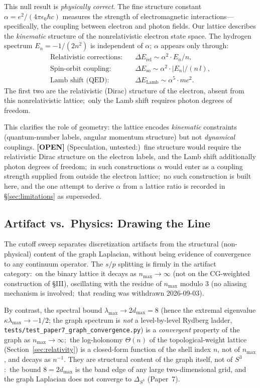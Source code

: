 \documentclass[aps,pra,twocolumn,superscriptaddress,longbibliography]{revtex4-2}
\newcommand{\gvc}[2]{#2}
\begin{document}
This null result is \textit{physically correct}. The fine structure constant $\alpha = e^2/(4\pi\epsilon_0 \hbar c)$ measures the strength of electromagnetic interactions---specifically, the coupling between electron and photon fields. Our lattice describes the \textit{kinematic} structure of the nonrelativistic electron state space. The hydrogen spectrum $E_n = -1/(2n^2)$ is independent of $\alpha$; $\alpha$ appears only through:
\begin{align}
\text{Relativistic corrections:} \quad & \Delta E_{\text{rel}} \sim \alpha^2 \cdot E_n / n, \\
\text{Spin-orbit coupling:} \quad & \Delta E_{\text{so}} \sim \alpha^2 \cdot |E_n| / (n\,l), \\
\text{Lamb shift (QED):} \quad & \Delta E_{\text{Lamb}} \sim \alpha^5 \cdot mc^2.
\end{align}
The first two are the relativistic (Dirac) structure of the electron, absent from this nonrelativistic lattice;\ only the Lamb shift requires photon degrees of freedom.

This clarifies the role of geometry: the lattice encodes \textit{kinematic} constraints (quantum-number labels, angular momentum structure) but not \textit{dynamical} couplings. \textbf{[OPEN]} (Speculation, untested:)\ fine structure would require the relativistic Dirac structure on the electron labels, and the Lamb shift additionally photon degrees of freedom;\ in such constructions $\alpha$ would enter as a coupling strength supplied from outside the electron lattice;\ no such construction is built here, and the one attempt to derive $\alpha$ from a lattice ratio is recorded in \S\ref{sec:limitations} as superseded.

\subsection{Artifact vs.\ Physics: Drawing the Line}

The cutoff sweep separates discretization artifacts from the
structural (non-physical) content of the graph Laplacian, without being
evidence of convergence to any continuum operator. The $s/p$ splitting is
firmly in the artifact category:\ on the binary lattice it decays as
$n_{\max} \to \infty$ (not on the CG-weighted construction of \S III),
oscillating with the residue of $n_{\max}$ modulo $3$ (no aliasing
mechanism is involved;\ that reading was withdrawn 2026-09-03).

By contrast, the spectral bound $\lambda_{\max} \to 2 d_{\max} = 8$
(hence the extremal eigenvalue $\kappa\lambda_{\max} \to -1/2$; the graph
spectrum is \emph{not} a level-by-level Rydberg ladder,
\texttt{tests/test\_paper7\_graph\_convergence.py}) is a \emph{convergent}
property of the graph as $n_{\max} \to \infty$;\ the log-holonomy
$\Theta(n)$ of the topological-weight lattice (Section~\ref{sec:relativity})
is a closed-form function of the shell index $n$, not of $n_{\max}$, and
decays as $n^{-1}$.
They are structural content of the graph itself, not of $S^3$:\ the
bound $8 = 2 d_{\max}$ is the band edge of any large two-dimensional grid,
and \gvc{graph-s3-wall}{the graph Laplacian does not converge to $\Delta_{S^3}$ (Paper~7)}.
\end{document}
